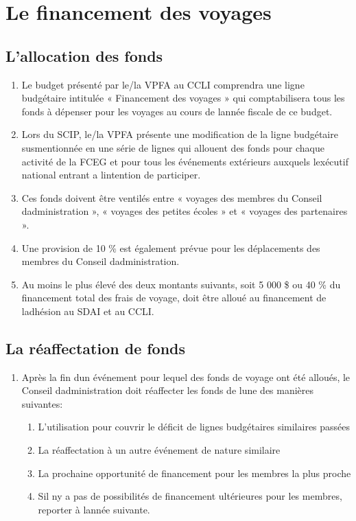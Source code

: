 \section{Le financement des voyages}
\label{le-financement-des-voyages}

\subsection{L'allocation des fonds}
\label{lallocation-des-fonds}

\begin{enumerate}
 \item
  Le budget présenté par le/la VPFA au CCLI comprendra une ligne budgétaire intitulée « Financement des voyages » qui comptabilisera tous les fonds à dépenser pour les voyages au cours de l\textquotesingle année fiscale de ce budget.
 \item
  Lors du SCIP, le/la VPFA présente une modification de la ligne budgétaire susmentionnée en une série de lignes qui allouent des fonds pour chaque activité de la FCEG et pour tous les événements extérieurs auxquels l\textquotesingle exécutif national entrant a l\textquotesingle intention de participer.
 \item
  Ces fonds doivent être ventilés entre « voyages des membres du Conseil d\textquotesingle administration », « voyages des petites écoles » et « voyages des partenaires ».
 \item
  Une provision de 10 \% est également prévue pour les déplacements des membres du Conseil d\textquotesingle administration.
 \item
  Au moins le plus élevé des deux montants suivants, soit 5 000 \$ ou 40 \% du financement total des frais de voyage, doit être alloué au financement de l\textquotesingle adhésion au SDAI et au CCLI.
\end{enumerate}

\subsection{La réaffectation de fonds}
\label{la-reaffectation-de-fonds}

\begin{enumerate}
 \item
  Après la fin d\textquotesingle un événement pour lequel des fonds de voyage ont été alloués, le Conseil d\textquotesingle administration doit réaffecter les fonds de l\textquotesingle une des manières suivantes:

  \begin{enumerate}
   \item
    L'utilisation pour couvrir le déficit de lignes budgétaires similaires passées
   \item
    La réaffectation à un autre événement de nature similaire
   \item
    La prochaine opportunité de financement pour les membres la plus proche
   \item
    S\textquotesingle il n\textquotesingle y a pas de possibilités de financement ultérieures pour les membres, reporter à l\textquotesingle année suivante.
  \end{enumerate}
\end{enumerate}

